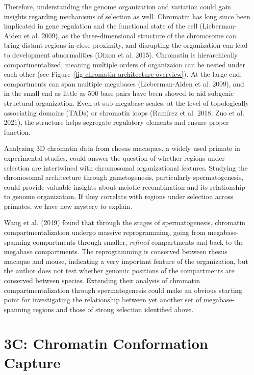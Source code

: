 \documentclass[
  11pt,
  a4paper,
]{scrbook}
\begin{document}
Therefore, understanding the genome organization and variation could
gain insights regarding mechanisms of selection as well. Chromatin has
long since been implicated in gene regulation and the functional state
of the cell (Lieberman-Aiden et al. 2009), as the three-dimensional
structure of the chromosome can bring distant regions in close
proximity, and disrupting the organization can lead to development
abnormalities (Dixon et al. 2015). Chromatin is hierarchically
compartmentalized, meaning multiple orders of organizaion can be nested
under each other (see Figure~\ref{fig-chromatin-architecture-overview}).
At the large end, compartments can span multiple megabases
(Lieberman-Aiden et al. 2009), and in the small end as little as 500
base pairs have been showed to aid subgenic structural organization.
Even at sub-megabase scales, at the level of topologically associating
domains (TADs) or chromatin loops (Ramírez et al. 2018; Zuo et al.
2021), the structure helps segregate regulatory elements and ensure
proper function.

Analyzing 3D chromatin data from rhesus macaques, a widely used primate
in experimental studies, could answer the question of whether regions
under selection are intertwined with chromosomal organizational
features. Studying the chromosomal architecture through gametogenesis,
particularly spermatogenesis, could provide valuable insights about
meiotic recombination and its relationship to genome organization. If
they correlate with regions under selection across primates, we have new
mystery to explain.

Wang et al. (2019) found that through the stages of spermatogenesis,
chromatin compartmentalization undergo massive reprogramming, going from
megabase-spanning compartments through smaller, \emph{refined}
compartments and back to the megabase compartments. The reprogramming is
conserved between rhesus macaque and mouse, indicating a very important
feature of the organization, but the author does not test whether
genomic positions of the compartments are conserved between species.
Extending their analysis of chromatin compartmentalization through
spermatogenesis could make an obvious starting point for investigating
the relationship between yet another set of megabase-spanning regions
and those of strong selection identified above.

\section{3C: Chromatin Conformation
Capture}\label{c-chromatin-conformation-capture}
\end{document}

